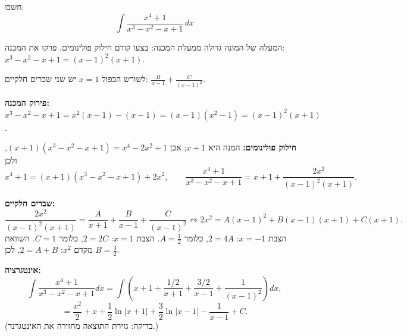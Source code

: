 
\begin{question}
חשבו:
\[ \int\frac{x^4+1}{x^3-x^2-x+1}\,dx \]
\end{question}

\begin{hint}
המעלה של המונה גדולה ממעלת המכנה: בצעו קודם חילוק פולינומים. פרקו את המכנה: $x^3-x^2-x+1=(x-1)^2(x+1)$.
\end{hint}

\begin{hint}
לשורש הכפול $x=1$ יש שני שברים חלקיים: $\frac{B}{x-1}+\frac{C}{(x-1)^2}$.
\end{hint}

\begin{solution}
\textbf{פירוק המכנה:} $x^3-x^2-x+1=x^2(x-1)-(x-1)=(x-1)(x^2-1)=(x-1)^2(x+1)$.

\textbf{חילוק פולינומים:} המנה היא $x+1$; אכן $(x+1)(x^3-x^2-x+1)=x^4-2x^2+1$, ולכן
\[ x^4+1=(x+1)(x^3-x^2-x+1)+2x^2,\qquad \frac{x^4+1}{x^3-x^2-x+1}=x+1+\frac{2x^2}{(x-1)^2(x+1)}. \]

\textbf{שברים חלקיים:}
\[ \frac{2x^2}{(x-1)^2(x+1)}=\frac{A}{x+1}+\frac{B}{x-1}+\frac{C}{(x-1)^2}\iff 2x^2=A(x-1)^2+B(x-1)(x+1)+C(x+1). \]
הצבת $x=-1$: $2=4A$, כלומר $A=\frac12$. הצבת $x=1$: $2=2C$, כלומר $C=1$. השוואת מקדם $x^2$: $2=A+B$, לכן $B=\frac32$.

\textbf{אינטגרציה:}
\[ \int\frac{x^4+1}{x^3-x^2-x+1}dx=\int\left(x+1+\frac{1/2}{x+1}+\frac{3/2}{x-1}+\frac{1}{(x-1)^2}\right)dx, \]
\[ \boxed{=\frac{x^2}{2}+x+\frac12\ln|x+1|+\frac32\ln|x-1|-\frac{1}{x-1}+C.} \]
(בדיקה: גזירת התוצאה מחזירה את האינטגרנד.)
\end{solution}
